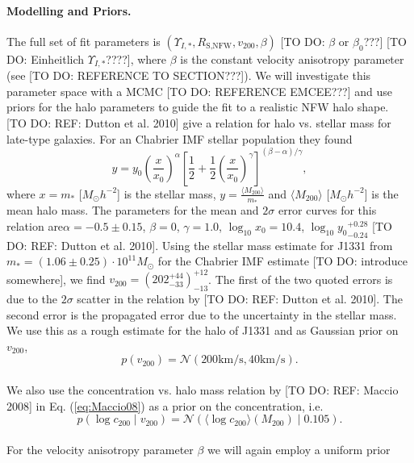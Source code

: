 \paragraph{Modelling and Priors.} The full set of fit parameters is $(\Upsilon_{I,*},R_\text{S,NFW},v_{200},\beta)$ [TO DO: $\beta$ or $\beta_0$???] [TO DO: Einheitlich $\Upsilon_{I,*}$????], where $\beta$ is the constant velocity anisotropy parameter (see [TO DO: REFERENCE TO SECTION???]). We will investigate this parameter space with a MCMC [TO DO: REFERENCE EMCEE???] and use priors for the halo parameters to guide the fit to a realistic NFW halo shape.
\\{[TO DO: REF: Dutton et al. 2010]} give a relation for halo vs. stellar mass for late-type galaxies. For an Chabrier IMF stellar population they found
\begin{equation*}
y = y_0 \left( \frac{x}{x_0} \right)^\alpha \left[ \frac 12 + \frac 12 \left(\frac{x}{x_0} \right)^\gamma \right]^{(\beta - \alpha)/\gamma},
\end{equation*}
where $x= m_*$ [$M_\odot h^{-2}$] is the stellar mass, $y = \frac{\langle M_{200}\rangle}{m_*}$ and $\langle M_{200}\rangle$ [$M_\odot h^{-2}$] is the mean halo mass. The parameters for the mean and $2\sigma$ error curves for this relation are$\alpha = -0.5\pm0.15$, $\beta = 0$, $\gamma = 1.0$, $\log_{10} x_0 = 10.4$, $\log_{10} {y_0}_{-0.24}^{+0.28}$ [TO DO: REF: Dutton et al. 2010]. Using the stellar mass estimate for J1331 from \citet{SWELLSI} $m_* = (1.06 \pm 0.25) \cdot 10^{11} M_\odot$ for the Chabrier IMF estimate [TO DO: introduce somewhere], we find ${v_{200}} = (202_{-33}^{+44})_{-13}^{+12}$. The first of the two quoted errors is due to the $2\sigma$ scatter in the relation by [TO DO: REF: Dutton et al. 2010]. The second error is the propagated error due to the uncertainty in the stellar mass. We use this as a rough estimate for the halo of J1331 and as Gaussian prior on $v_{200}$, 
\begin{equation*}
p(v_{200}) = \mathscr{N}(200 \text{km/s} ,40 \text{km/s}).
\end{equation*}
\\We also use the concentration vs. halo mass relation by [TO DO: REF: Maccio 2008] in Eq. (\ref{eq:Maccio08}) as a prior on the concentration, i.e.
\begin{equation*}
p(\log c_{200} \mid v_{200}) = \mathscr{N}\left(\langle \log c_{200} \rangle (M_{200}) \mid 0.105 \right).
\end{equation*}
\\For the velocity anisotropy parameter $\beta$ we will again employ a uniform prior 
